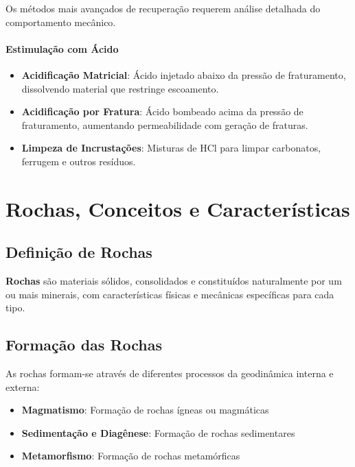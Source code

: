 \documentclass[12pt,a4paper,twoside]{book}
\begin{document}
Os métodos mais avançados de recuperação requerem análise detalhada do comportamento mecânico.

\subsubsection{Estimulação com Ácido}

\begin{itemize}
    \item \textbf{Acidificação Matricial}: Ácido injetado abaixo da pressão de fraturamento, 
    dissolvendo material que restringe escoamento.
    
    \item \textbf{Acidificação por Fratura}: Ácido bombeado acima da pressão de fraturamento, 
    aumentando permeabilidade com geração de fraturas.
    
    \item \textbf{Limpeza de Incrustações}: Misturas de HCl para limpar carbonatos, ferrugem 
    e outros resíduos.
\end{itemize}

\newpage

\chapter{Rochas, Conceitos e Características}

\section{Definição de Rochas}

\textbf{Rochas} são materiais sólidos, consolidados e constituídos naturalmente por um ou mais 
minerais, com características físicas e mecânicas específicas para cada tipo.

\section{Formação das Rochas}

As rochas formam-se através de diferentes processos da geodinâmica interna e externa:
\begin{itemize}
    \item \textbf{Magmatismo}: Formação de rochas ígneas ou magmáticas
    \item \textbf{Sedimentação e Diagênese}: Formação de rochas sedimentares
    \item \textbf{Metamorfismo}: Formação de rochas metamórficas
\end{itemize}
\end{document}
